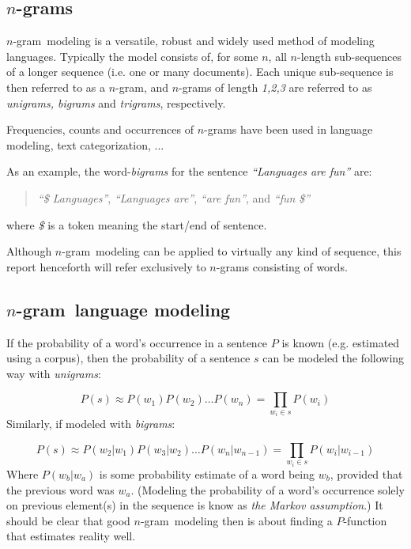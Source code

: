 \documentclass[a4paper,11pt]{kth-mag}
\newcommand{\todo}{ ... }
\newcommand{\ngram}{$n$-gram}
\begin{document}
\subsection{\ngram s}
\ngram~modeling is a versatile, robust and widely used method of modeling languages. Typically the model consists of, for some $n$, all $n$-length sub-sequences of a longer sequence (i.e. one or many documents). Each unique sub-sequence is then referred to as a \ngram, and \ngram s of length \emph{1,2,3} are referred to as \emph{unigrams, bigrams} and \emph{trigrams}, respectively\cite{ngrams}.

Frequencies, counts and occurrences of \ngram s have been used in language modeling\cite{chen_goodman}, text categorization\cite{ngrams}, \todo

As an example, the word-\emph{bigrams} for the sentence \emph{``Languages are fun''} are:
\begin{quote}
  \vspace*{0.1cm}
  \centering
\emph{``\$ Languages''}, \emph{``Languages are''}, \emph{``are fun''}, and \emph{``fun \$''}
\end{quote}
where \emph{\$} is a token meaning the start/end of sentence.

Although \ngram~modeling can be applied to virtually any kind of sequence, this report henceforth will refer exclusively to \ngram s consisting of words.

\subsection{\ngram~language modeling}
If the probability of a word's occurrence in a sentence $P$ is known (e.g. estimated using a corpus), then the probability of a sentence $s$ can be modeled the following way with \emph{unigrams}:

\begin{equation} \label{eq:unigram_chain_prob}
P(s) \approx P(w_1) P(w_2) \dots P(w_n) =\prod_{w_i \in s}P(w_i)
\end{equation}
Similarly, if modeled with \emph{bigrams}:

\begin{equation} \label{eq:bigram_chain_prob}
P(s) \approx P(w_2 | w_1)P(w_3 | w_2) \dots P(w_n | w_{n-1}) = \prod_{w_i \in s}P(w_i|w_{i-1})
\end{equation}
Where $P(w_b | w_a)$ is some probability estimate of a word being $w_b$, provided that the previous word was $w_a$. (Modeling the probability of a word's occurrence solely on previous element(s) in the sequence is know as \emph{the Markov assumption}.) It should be clear that good \ngram~modeling then is about finding a $P$-function that estimates reality well.
\end{document}
